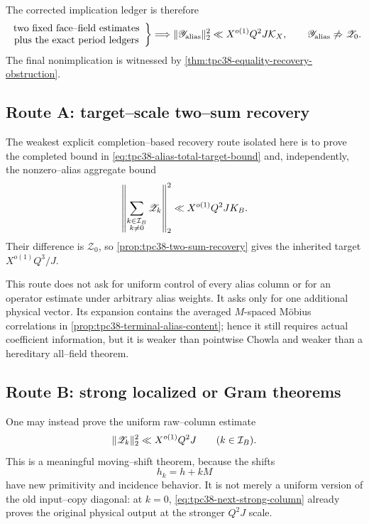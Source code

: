 The corrected implication ledger is therefore
\begin{equation}
 \left.
 \begin{array}{c}
  \text{two fixed face--field estimates}\\
  \text{plus the exact period ledgers}
 \end{array}
 \right\}
 \Longrightarrow
 \|\mathscr Y_{\rm alias}\|_2^2
 \ll X^{o(1)}Q^2J\mathcal K_X,
 \qquad
 \mathscr Y_{\rm alias}\not\Rightarrow\mathscr Z_0.
 \label{eq:tpc38-corrected-implication-ledger}
\end{equation}
The final nonimplication is witnessed by
\cref{thm:tpc38-equality-recovery-obstruction}.

\subsection{Route A: target--scale two--sum recovery}

The weakest explicit completion--based recovery route isolated here is to prove the completed
bound in \eqref{eq:tpc38-alias-total-target-bound} and, independently, the
nonzero--alias aggregate bound
\begin{equation}
 \left\|\sum_{\substack{k\in\mathcal I_B\\k\ne0}}\mathscr Z_k\right\|_2^2
 \ll X^{o(1)}Q^2J K_B.
 \label{eq:tpc38-next-nonzero-alias}
\end{equation}
Their difference is \(\mathscr Z_0\), so
\cref{prop:tpc38-two-sum-recovery} gives the inherited target
\(X^{o(1)}Q^3/J\).

This route does not ask for uniform control of every alias column or for an
operator estimate under arbitrary alias weights.  It asks only for one
additional physical vector.  Its expansion contains the averaged
\(M\)-spaced M\"obius correlations in
\cref{prop:tpc38-terminal-alias-content}; hence it still requires actual
coefficient information, but it is weaker than pointwise Chowla and weaker
than a hereditary all--field theorem.

\subsection{Route B: strong localized or Gram theorems}

One may instead prove the uniform raw--column estimate
\begin{equation}
 \|\mathscr Z_k\|_2^2\ll X^{o(1)}Q^2J
 \qquad(k\in\mathcal I_B).
 \label{eq:tpc38-next-strong-column}
\end{equation}
This is a meaningful moving--shift theorem, because the shifts
\begin{equation}
 h_k=h+kM
 \label{eq:tpc38-next-moving-h}
\end{equation}
have new primitivity and incidence behavior.  It is not merely a uniform
version of the old input--copy diagonal: at \(k=0\),
\eqref{eq:tpc38-next-strong-column} already proves the original physical
output at the stronger \(Q^2J\) scale.

